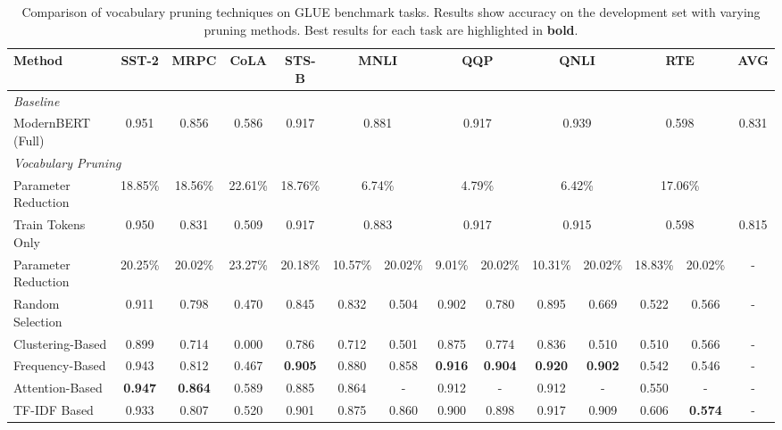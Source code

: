 \documentclass[twocolumn]{article}
\begin{document}
\begin{table*}[h]
\centering
\scriptsize
\caption{Comparison of vocabulary pruning techniques on GLUE benchmark tasks. Results show accuracy on the development set with varying pruning methods. Best results for each task are highlighted in \textbf{bold}.}
\label{tab:results}
\setlength{\tabcolsep}{2.8pt}
\begin{tabular}{lcccc|cc|cc|cc|cc|c}
\toprule
\textbf{Method} & \textbf{SST-2} & \textbf{MRPC} & \textbf{CoLA} & \textbf{STS-B} & \multicolumn{2}{c|}{\textbf{MNLI}} & \multicolumn{2}{c|}{\textbf{QQP}} & \multicolumn{2}{c|}{\textbf{QNLI}} & \multicolumn{2}{c|}{\textbf{RTE}} & \textbf{AVG} \\
\midrule
\multicolumn{14}{l}{\textit{Baseline}} \\
ModernBERT (Full) & 0.951 & 0.856 & 0.586 & 0.917 & \multicolumn{2}{c|}{0.881} & \multicolumn{2}{c|}{0.917} & \multicolumn{2}{c|}{0.939} & \multicolumn{2}{c|}{0.598} & 0.831 \\
\midrule
\multicolumn{14}{l}{\textit{Vocabulary Pruning}} \\
Parameter Reduction & 18.85\% & 18.56\% & 22.61\% & 18.76\% & \multicolumn{2}{c|}{6.74\%} & \multicolumn{2}{c|}{4.79\%} & \multicolumn{2}{c|}{6.42\%} & \multicolumn{2}{c|}{17.06\%} & \\
Train Tokens Only & 0.950 & 0.831 & 0.509 & 0.917 & \multicolumn{2}{c|}{0.883} & \multicolumn{2}{c|}{0.917} & \multicolumn{2}{c|}{0.915} & \multicolumn{2}{c|}{0.598} & 0.815 \\
\midrule
Parameter Reduction & 20.25\% & 20.02\% & 23.27\% & 20.18\% & 10.57\% & 20.02\% & 9.01\% & 20.02\% & 10.31\% & 20.02\% & 18.83\% & 20.02\% & - \\
Random Selection & 0.911 & 0.798 & 0.470 & 0.845 & 0.832 & 0.504 & 0.902 & 0.780 & 0.895 & 0.669 & 0.522 & 0.566 & - \\
Clustering-Based & 0.899 & 0.714 & 0.000 & 0.786 & 0.712 & 0.501 & 0.875 & 0.774 & 0.836 & 0.510 & 0.510 & 0.566 & - \\
Frequency-Based & 0.943 & 0.812 & 0.467 & \textbf{0.905} & 0.880 & 0.858 & \textbf{0.916} & \textbf{0.904} & \textbf{0.920} & \textbf{0.902} & 0.542 & 0.546 & - \\
Attention-Based & \textbf{0.947} & \textbf{0.864} & 0.589 & 0.885 & 0.864 & - & 0.912 & - & 0.912 & - & 0.550 & - & - \\
TF-IDF Based & 0.933 & 0.807 & 0.520 & 0.901 & 0.875 & 0.860 & 0.900 & 0.898 & 0.917 & 0.909 & 0.606 & \textbf{0.574} & - \\

\end{tabular}
\end{table*}
\end{document}

